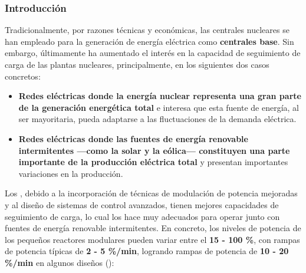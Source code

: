 \subsubsection{Introducción}

Tradicionalmente, por razones técnicas y económicas, las centrales nucleares se han empleado para la generación de energía eléctrica como \textbf{centrales base}.
Sin embargo, últimamente ha aumentado el interés en la capacidad de seguimiento de carga de las plantas nucleares, principalmente, en los siguientes dos casos concretos:

\begin{itemize}
  \item \textbf{Redes eléctricas donde la energía nuclear representa una gran parte de la generación energética total} e interesa que esta fuente de energía, al ser mayoritaria, pueda adaptarse a las fluctuaciones de la demanda eléctrica.
  \item \textbf{Redes eléctricas donde las fuentes de energía renovable intermitentes ---como la solar y la eólica--- constituyen una parte importante de la producción eléctrica total} y presentan importantes variaciones en la producción.
\end{itemize} 

Los \textbf{}, debido a la incorporación de técnicas de modulación de potencia mejoradas y al diseño de sistemas de control avanzados, tienen mejores capacidades de seguimiento de carga, lo cual los hace muy adecuados para operar junto con fuentes de energía renovable intermitentes. En concreto, los niveles de potencia de los pequeños reactores modulares pueden variar entre el \textbf{15 - 100 \%}, con rampas de potencia típicas de \textbf{2 - 5 \%/min}, logrando rampas de potencia de \textbf{10 - 20 \%/min} en algunos diseños (\cite{ANS_2019}): 

